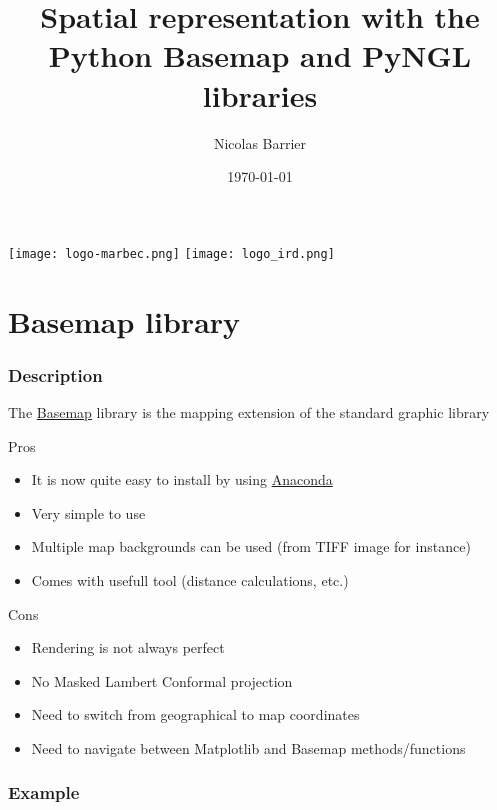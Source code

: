 \documentclass{beamer}
\title[Spatial representation with Python]{Spatial representation with the Python Basemap and PyNGL libraries} %
\author{Nicolas Barrier} %
\institute[UMR MARBEC] %
{
UMR MARBEC \\ %
\medskip
\textit{nicolas.barrier@ird.fr} %
}
\date{\today} %
\begin{document}
\begin{frame}
\titlepage %
    \vspace{-1em}
\begin{center}
\texttt{[image: logo-marbec.png]}
\hspace{1em}
\texttt{[image: logo\_ird.png]}
\end{center}
\end{frame}

\section{Basemap library}
\begin{frame}[fragile]
\frametitle{Description}
    The \href{https://matplotlib.org/basemap/}{Basemap} library is the mapping extension of the standard graphic library
    \footnotesize{
\begin{block}{Pros}
    \begin{itemize}
        \item{It is now quite easy to install by using \href{https://www.anaconda.com/}{Anaconda}}
        \item{Very simple to use}
        \item{Multiple map backgrounds can be used (from TIFF image for instance)}
        \item{Comes with usefull tool (distance calculations, etc.)}
    \end{itemize}
\end{block}
\begin{alertblock}{Cons}
    \begin{itemize}
        \item{Rendering is not always perfect}
        \item{No Masked Lambert Conformal projection}
        \item{Need to switch from geographical to map coordinates}
        \item{Need to navigate between Matplotlib and Basemap methods/functions}
    \end{itemize}
\end{alertblock}
}
\end{frame}

\begin{frame}[fragile]
\frametitle{Example}

\end{frame}
\end{document}
